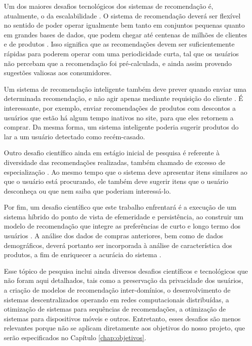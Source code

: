 Um dos maiores desafios tecnológicos dos sistemas de recomendação é, atualmente, o da escalabilidade \cite{wei2007survey}. O sistema de recomendação deverá ser flexível no sentido de poder operar igualmente bem tanto em conjuntos pequenas quanto em grandes bases de dados, que podem chegar até centenas de milhões de clientes \cite{amazoncustomers} e de produtos \cite{amazonproducts}. Isso significa que as recomendações devem ser suficientemente rápidas para poderem operar com uma periodicidade curta, tal que os usuários não percebam que a recomendação foi pré-calculada, e ainda assim provendo sugestões valiosas aos consumidores.

Um sistema de recomendação inteligente também deve prever quando enviar uma determinada recomendação, e não agir apenas mediante requisição do cliente \cite{lops2011content}. É interessante, por exemplo, enviar recomendações de produtos com descontos a usuários que estão há algum tempo inativos no site, para que eles retornem a comprar. Da mesma forma, um sistema inteligente poderia sugerir produtos do lar a um usuário detectado como recém-casado.

Outro desafio científico ainda em estágio inicial de pesquisa é referente à diversidade das recomendações realizadas, também chamado de excesso de especialização \cite{adomavicius2005toward}. Ao mesmo tempo que o sistema deve apresentar itens similares ao que o usuário está procurando, ele também deve sugerir itens que o usuário desconheça ou que nem saiba que poderiam interessá-lo. 

Por fim, um desafio científico que este trabalho enfrentará é a execução de um sistema híbrido do ponto de vista de efemeridade e persistência, ao construir um modelo de recomendação que integre as preferências de curto e longo termo dos usuários \cite{schafer1999recommender}. A análise dos dados de compras anteriores, bem como de dados demográficos, deverá portanto ser incorporada à análise de característica dos produtos, a fim de enriquecer a acurácia do sistema \cite{wei2007survey}.

Esse tópico de pesquisa inclui ainda diversos desafios científicos e tecnológicos que não foram aqui detalhados, tais como a preservação da privacidade dos usuários, a criação de modelos de recomendação inter-domínios, o desenvolvimento de sistemas descentralizados operando em redes computacionais distribuídas, a otimização de sistemas para sequências de recomendações, a otimização de sistemas para dispositivos móveis e outros. Entretanto, esses desafios são menos relevantes porque não se aplicam diretamente aos objetivos do nosso projeto, que serão especificados no Capítulo \ref{chap:objetivos}.

